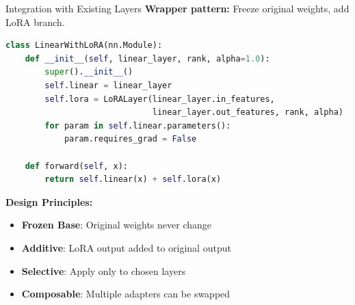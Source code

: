 \documentclass[aspectratio=169,10pt]{beamer}
\begin{document}
\begin{frame}[fragile]{Integration with Existing Layers}
	\textbf{Wrapper pattern:} Freeze original weights, add LoRA branch.

	\begin{lstlisting}[language=Python]
class LinearWithLoRA(nn.Module):
    def __init__(self, linear_layer, rank, alpha=1.0):
        super().__init__()
        self.linear = linear_layer
        self.lora = LoRALayer(linear_layer.in_features,
                              linear_layer.out_features, rank, alpha)
        for param in self.linear.parameters():
            param.requires_grad = False

    def forward(self, x):
        return self.linear(x) + self.lora(x)
    \end{lstlisting}

	\vspace{0.2cm}
	\textbf{Design Principles:}
	\begin{itemize}
		\item \textbf{Frozen Base}: Original weights never change
		\item \textbf{Additive}: LoRA output added to original output
		\item \textbf{Selective}: Apply only to chosen layers
		\item \textbf{Composable}: Multiple adapters can be swapped
	\end{itemize}
\end{frame}
\end{document}
